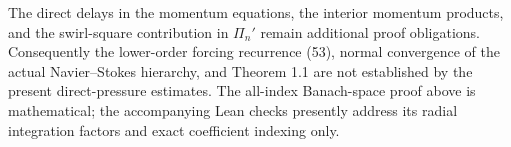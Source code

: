 The direct delays in the momentum equations, the interior
momentum products, and the swirl-square contribution in
$\Pi_n'$ remain additional proof obligations. Consequently
the lower-order forcing recurrence (53), normal convergence of
the actual Navier--Stokes hierarchy, and Theorem 1.1 are not
established by the present direct-pressure estimates.
The all-index Banach-space proof above is mathematical;
the accompanying Lean checks presently address its radial
integration factors and exact coefficient indexing only.
